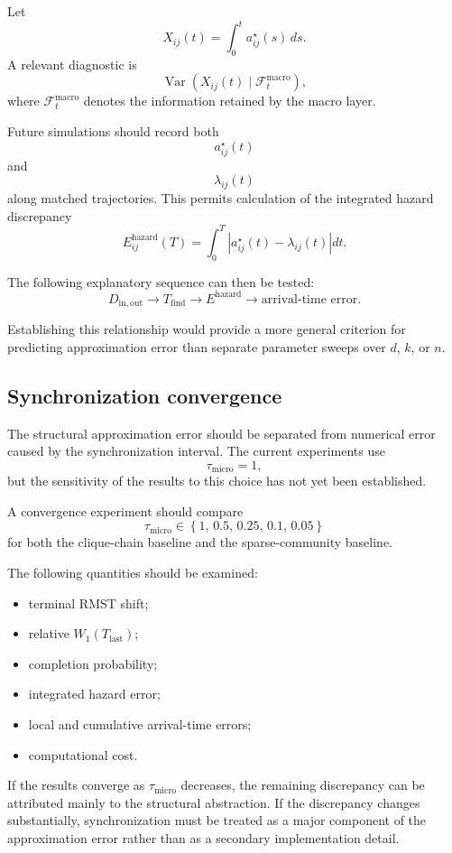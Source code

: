 \documentclass[12pt,a4paper]{article}
\begin{document}
Let
\[
X_{ij}(t)
=
\int_0^t
a^\star_{ij}(s)\,ds.
\]
A relevant diagnostic is
\[
\operatorname{Var}
\left(
X_{ij}(t)
\mid
\mathcal{F}^{\mathrm{macro}}_t
\right),
\]
where \(\mathcal{F}^{\mathrm{macro}}_t\) denotes the information retained by the macro layer.

Future simulations should record both
\[
a^\star_{ij}(t)
\]
and
\[
\lambda_{ij}(t)
\]
along matched trajectories. This permits calculation of the integrated hazard discrepancy
\[
E^{\mathrm{hazard}}_{ij}(T)
=
\int_0^T
\left|
a^\star_{ij}(t)-\lambda_{ij}(t)
\right|dt.
\]

The following explanatory sequence can then be tested:
\[
D_{\mathrm{in,out}}
\longrightarrow
T_{\mathrm{find}}
\longrightarrow
E^{\mathrm{hazard}}
\longrightarrow
\text{arrival-time error}.
\]

Establishing this relationship would provide a more general criterion for predicting approximation error than separate parameter sweeps over \(d\), \(k\), or \(n\).

\subsection{Synchronization convergence}

The structural approximation error should be separated from numerical error caused by the synchronization interval. The current experiments use
\[
\tau_{\mathrm{micro}}=1,
\]
but the sensitivity of the results to this choice has not yet been established.

A convergence experiment should compare
\[
\tau_{\mathrm{micro}}
\in
\left\{
1,\,
0.5,\,
0.25,\,
0.1,\,
0.05
\right\}
\]
for both the clique-chain baseline and the sparse-community baseline.

The following quantities should be examined:
\begin{itemize}
    \item terminal RMST shift;
    \item relative \(W_1(T_{\mathrm{last}})\);
    \item completion probability;
    \item integrated hazard error;
    \item local and cumulative arrival-time errors;
    \item computational cost.
\end{itemize}

If the results converge as \(\tau_{\mathrm{micro}}\) decreases, the remaining discrepancy can be attributed mainly to the structural abstraction. If the discrepancy changes substantially, synchronization must be treated as a major component of the approximation error rather than as a secondary implementation detail.
\end{document}
